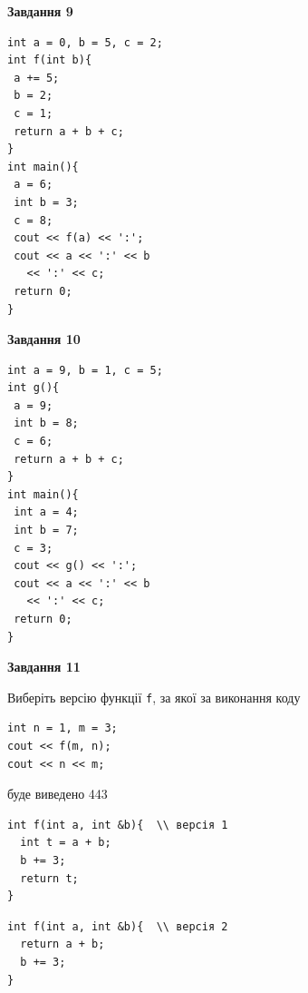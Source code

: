 \documentclass[12pt, ukrainian]{article}
\def\code#1{\Verb!#1!}
\begin{document}
{\begin {large}
\begin{minipage}[t]{11.0cm}
\end{minipage}


\begin{minipage}[t]{7.0cm}

\begin{center}
\textbf{Завдання 9}
\end{center}
\vspace{-8mm}

\begin{verbatim}
int a = 0, b = 5, c = 2;
int f(int b){
 a += 5;
 b = 2;
 c = 1;
 return a + b + c;
}
int main(){
 a = 6;
 int b = 3;
 c = 8;
 cout << f(a) << ':';
 cout << a << ':' << b 
   << ':' << c;
 return 0;
}
\end{verbatim}



\begin{center}
\textbf{Завдання 10}
\end{center}
\vspace{-8mm}

\begin{verbatim}
int a = 9, b = 1, c = 5;
int g(){
 a = 9;
 int b = 8;
 c = 6;
 return a + b + c;
}
int main(){
 int a = 4;
 int b = 7;
 c = 3;
 cout << g() << ':';
 cout << a << ':' << b 
   << ':' << c;
 return 0;
}
\end{verbatim}

\end{minipage}
\vline \hspace{1mm}
\begin{minipage}[t]{11.0cm}

\begin{center}
\textbf{Завдання 11}
\end{center}
Виберіть версію функції \code{f}, за якої за виконання коду
\begin{verbatim}
int n = 1, m = 3;
cout << f(m, n);
cout << n << m;
\end{verbatim}

буде виведено 443

\begin{verbatim}
int f(int a, int &b){  \\ версія 1
  int t = a + b;
  b += 3;
  return t;
}
\end{verbatim}

\vspace{-8mm}\begin{verbatim}
int f(int a, int &b){  \\ версія 2
  return a + b;
  b += 3;
}
\end{verbatim}


\end{minipage}
\end{large}}
\end{document}
